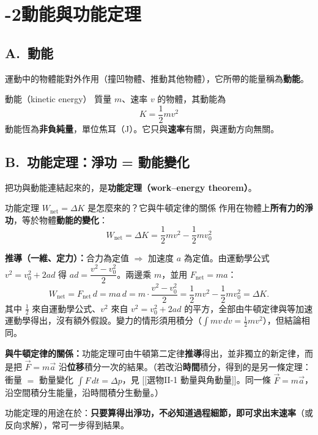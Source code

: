 \documentclass[11pt]{article}
\begin{document}


\section*{-2\quad 動能與功能定理}

\subsection*{\sffamily A.\ 動能}

運動中的物體能對外作用（撞凹物體、推動其他物體），它所帶的能量稱為\textbf{動能}。

\begin{補充框}{動能（kinetic energy）}
質量 $m$、速率 $v$ 的物體，其動能為
$$\boxed{\;K=\frac{1}{2}mv^2\;}$$
動能恆為\textbf{非負純量}，單位焦耳（J）。它只與\textbf{速率}有關，與運動方向無關。
\end{補充框}

\subsection*{\sffamily B.\ 功能定理：淨功 = 動能變化}

把功與動能連結起來的，是\textbf{功能定理（work–energy theorem）}。

\begin{補充框}{功能定理 $W_{\text{net}}=\Delta K$ 是怎麼來的？它與牛頓定律的關係}
作用在物體上\textbf{所有力的淨功}，等於物體\textbf{動能的變化}：
$$\boxed{\;W_{\text{net}}=\Delta K=\frac{1}{2}mv^2-\frac{1}{2}mv_0^2\;}$$

\textbf{推導（一維、定力）：}合力為定值 $\Rightarrow$ 加速度 $a$ 為定值。由運動學公式 $v^2=v_0^2+2ad$ 得 $ad=\dfrac{v^2-v_0^2}{2}$。兩邊乘 $m$，並用 $F_{\text{net}}=ma$：
$$W_{\text{net}}=F_{\text{net}}\,d=ma\,d=m\cdot\frac{v^2-v_0^2}{2}=\frac{1}{2}mv^2-\frac{1}{2}mv_0^2=\Delta K.$$
其中 $\tfrac12$ 來自運動學公式、$v^2$ 來自 $v^2=v_0^2+2ad$ 的平方，全部由牛頓定律與等加速運動學得出，沒有額外假設。變力的情形須用積分（$\int mv\,dv=\tfrac12mv^2$），但結論相同。

\textbf{與牛頓定律的關係：}功能定理可由牛頓第二定律\textbf{推導}得出，並非獨立的新定律，而是把 $\vec F=m\vec a$ 沿\textbf{位移}積分一次的結果。（若改沿\textbf{時間}積分，得到的是另一條定理：衝量 $=$ 動量變化 $\int F\,dt=\Delta p$，見 [[選物II-1 動量與角動量]]。同一條 $\vec F=m\vec a$，沿空間積分生能量，沿時間積分生動量。）

功能定理的用途在於：\textbf{只要算得出淨功，不必知道過程細節，即可求出末速率}（或反向求解），常可一步得到結果。
\end{補充框}
\end{document}
